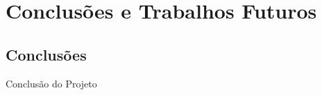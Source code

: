 \chapter{Conclusões e Trabalhos Futuros}\label{cap:conclusão}

\section{Conclusões}

Conclusão do Projeto